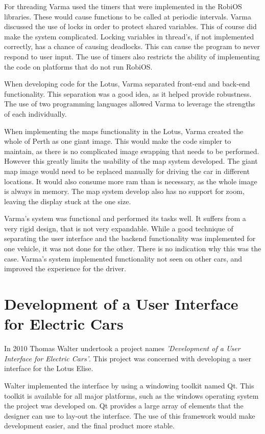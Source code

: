 For threading Varma used the timers that were implemented in the RobiOS libraries. These would cause functions to be called at periodic intervals. Varma discussed the use of locks in order to protect shared variables. This of course did make the system complicated. Locking variables in thread's, if not implemented correctly, has a chance of causing deadlocks. This can cause the program to never respond to user input. The use of timers also restricts the ability of implementing the code on platforms that do not run RobiOS.

When developing code for the Lotus, Varma separated front-end and back-end functionality. This separation was a good idea, as it helped provide robustness. The use of two programming languages allowed Varma to leverage the strengths of each individually.

When implementing the maps functionality in the Lotus, Varma created the whole of Perth as one giant image. This would make the code simpler to maintain, as there is no complicated image swapping that needs to be performed. However this greatly limits the usability of the map system developed. The giant map image would need to be replaced manually for driving the car in different locations. It would also consume more ram than is necessary, as the whole image is always in memory. The map system develop also has no support for zoom, leaving the display stuck at the one size.

Varma's system was functional and performed its tasks well. It suffers from a very rigid design, that is not very expandable. While a good technique of separating the user interface and the backend functionality was implemented for one vehicle, it was not done for the other. There is no indication why this was the case. Varma's system implemented functionality not seen on other cars, and improved the experience for the driver.

\section{Development of a User Interface
for Electric Cars}

In 2010 Thomas Walter undertook a project names \emph{'Development of a User Interface
for Electric Cars'}. This project was concerned with developing a user interface for the Lotus Elise.

Walter implemented the interface by using a windowing toolkit named Qt. This toolkit is available for all major platforms, such as the windows operating system the project was developed on. Qt provides a large array of elements that the designer can use to lay-out the interface. The use of this framework would make development easier, and the final product more stable.

